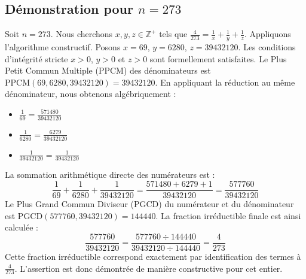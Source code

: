 \documentclass[11pt,a4paper]{article}
\begin{document}
\subsection{Démonstration pour $n = 273$}
Soit $n = 273$. Nous cherchons $x, y, z \in \mathbb{Z}^{+}$ tels que $\frac{4}{273} = \frac{1}{x} + \frac{1}{y} + \frac{1}{z}$.
Appliquons l'algorithme constructif. Posons $x = 69$, $y = 6280$, $z = 39432120$.
Les conditions d'intégrité stricte $x > 0$, $y > 0$ et $z > 0$ sont formellement satisfaites.
Le Plus Petit Commun Multiple (PPCM) des dénominateurs est $\text{PPCM}(69, 6280, 39432120) = 39432120$.
En appliquant la réduction au même dénominateur, nous obtenons algébriquement :
\begin{itemize}
    \item $\frac{1}{69} = \frac{571480}{39432120}$
    \item $\frac{1}{6280} = \frac{6279}{39432120}$
    \item $\frac{1}{39432120} = \frac{1}{39432120}$
\end{itemize}
La sommation arithmétique directe des numérateurs est :
$$ \frac{1}{69} + \frac{1}{6280} + \frac{1}{39432120} = \frac{571480 + 6279 + 1}{39432120} = \frac{577760}{39432120} $$
Le Plus Grand Commun Diviseur (PGCD) du numérateur et du dénominateur est $\text{PGCD}(577760, 39432120) = 144440$.
La fraction irréductible finale est ainsi calculée :
$$ \frac{577760}{39432120} = \frac{577760 \div 144440}{39432120 \div 144440} = \frac{4}{273} $$
Cette fraction irréductible correspond exactement par identification des termes à $\frac{4}{273}$. L'assertion est donc démontrée de manière constructive pour cet entier.
\end{document}
